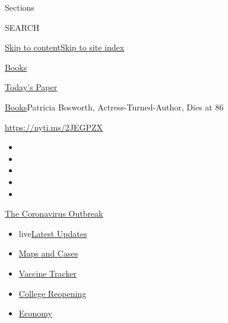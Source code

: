 Sections

SEARCH

\protect\hyperlink{site-content}{Skip to
content}\protect\hyperlink{site-index}{Skip to site index}

\href{https://www.nytimes3xbfgragh.onion/section/books}{Books}

\href{https://myaccount.nytimes3xbfgragh.onion/auth/login?response_type=cookie\&client_id=vi}{}

\href{https://www.nytimes3xbfgragh.onion/section/todayspaper}{Today's
Paper}

\href{/section/books}{Books}\textbar{}Patricia Bosworth,
Actress-Turned-Author, Dies at 86

\url{https://nyti.ms/2JEGPZX}

\begin{itemize}
\item
\item
\item
\item
\item
\end{itemize}

\href{https://www.nytimes3xbfgragh.onion/news-event/coronavirus?action=click\&pgtype=Article\&state=default\&region=TOP_BANNER\&context=storylines_menu}{The
Coronavirus Outbreak}

\begin{itemize}
\tightlist
\item
  live\href{https://www.nytimes3xbfgragh.onion/2020/08/04/world/coronavirus-covid-19.html?action=click\&pgtype=Article\&state=default\&region=TOP_BANNER\&context=storylines_menu}{Latest
  Updates}
\item
  \href{https://www.nytimes3xbfgragh.onion/interactive/2020/us/coronavirus-us-cases.html?action=click\&pgtype=Article\&state=default\&region=TOP_BANNER\&context=storylines_menu}{Maps
  and Cases}
\item
  \href{https://www.nytimes3xbfgragh.onion/interactive/2020/science/coronavirus-vaccine-tracker.html?action=click\&pgtype=Article\&state=default\&region=TOP_BANNER\&context=storylines_menu}{Vaccine
  Tracker}
\item
  \href{https://www.nytimes3xbfgragh.onion/2020/08/02/us/covid-college-reopening.html?action=click\&pgtype=Article\&state=default\&region=TOP_BANNER\&context=storylines_menu}{College
  Reopening}
\item
  \href{https://www.nytimes3xbfgragh.onion/live/2020/08/03/business/stock-market-today-coronavirus?action=click\&pgtype=Article\&state=default\&region=TOP_BANNER\&context=storylines_menu}{Economy}
\end{itemize}

